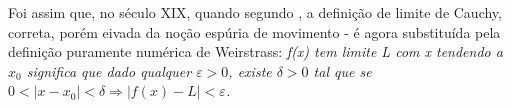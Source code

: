 Foi assim que, no século XIX, quando segundo , a
definição de limite de Cauchy, correta, porém eivada da noção
espúria de movimento - é agora substituída pela definição puramente
numérica de Weirstrass: \emph{f(x) tem limite L com x tendendo a
$x_{0}$ significa que dado qualquer $\varepsilon>0$, existe
$\delta>0$ tal que se
$0<|x-x_0|<\delta\Rightarrow|f(x)-L|<\varepsilon$.}
